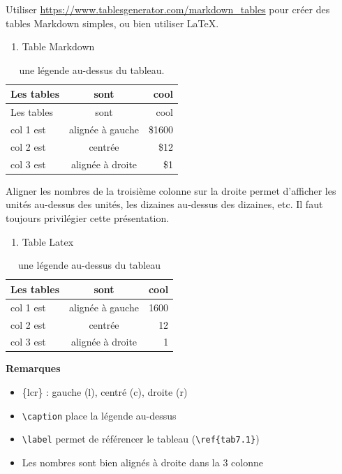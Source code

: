 \documentclass[mstat,12pt]{unswthesis}
\begin{document}
Utiliser \url{https://www.tablesgenerator.com/markdown_tables} pour
créer des tables Markdown simples, ou bien utiliser \LaTeX.

\begin{enumerate}
\def\labelenumi{\arabic{enumi}.}
\tightlist
\item
  Table Markdown
\end{enumerate}

\begin{longtable}[]{@{}lcr@{}}
\caption{une légende au-dessus du tableau.
\label{tab7.1}}\tabularnewline
\toprule\noalign{}
Les tables & sont & cool \\
\midrule\noalign{}
\endfirsthead
\toprule\noalign{}
Les tables & sont & cool \\
\midrule\noalign{}
\endhead
\bottomrule\noalign{}
\endlastfoot
col 1 est & alignée à gauche & \$1600 \\
col 2 est & centrée & \$12 \\
col 3 est & alignée à droite & \$1 \\
\end{longtable}

Aligner les nombres de la troisième colonne sur la droite permet
d'afficher les unités au-dessus des unités, les dizaines au-dessus des
dizaines, etc. Il faut toujours privilégier cette présentation.

\vspace{3em}

\begin{enumerate}
\def\labelenumi{\arabic{enumi}.}
\setcounter{enumi}{1}
\tightlist
\item
  Table Latex
\end{enumerate}

\begin{table}[h]
\centering
\caption{une légende au-dessus du tableau}
\label{tab7.1}
\begin{tabular}{lcr}
\hline
Les tables & sont & cool \\
\hline
col 1 est & alignée à gauche & 1600 \\
col 2 est & centrée & 12 \\
col 3 est & alignée à droite & 1 \\
\hline
\end{tabular}
\end{table}

\textbf{Remarques}

\begin{itemize}
  \item \{lcr\} : gauche (l), centré (c), droite (r)
  \item \verb|\caption| place la légende au-dessus
  \item \verb|\label| permet de référencer le tableau (\verb|\ref{tab7.1}|)
  \item Les nombres sont bien alignés à droite dans la 3\ieme{} colonne
\end{itemize}
\end{document}
